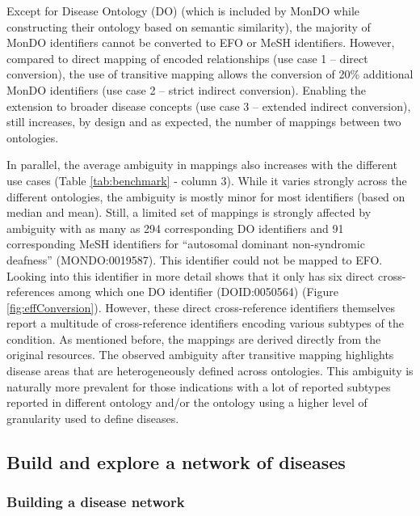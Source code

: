 \documentclass[9pt,a4paper,]{extarticle}
\begin{document}
Except for Disease Ontology (DO) (which is included by MonDO while constructing their ontology based on semantic similarity), the majority of MonDO identifiers cannot be converted to EFO or MeSH identifiers. However, compared to direct mapping of encoded relationships (use case 1 -- direct conversion), the use of transitive mapping allows the conversion of 20\% additional MonDO identifiers (use case 2 -- strict indirect conversion). Enabling the extension to broader disease concepts (use case 3 -- extended indirect conversion), still increases, by design and as expected, the number of mappings between two ontologies.

In parallel, the average ambiguity in mappings also increases with the different use cases (Table \ref{tab:benchmark} - column 3). While it varies strongly across the different ontologies, the ambiguity is mostly minor for most identifiers (based on median and mean). Still, a limited set of mappings is strongly affected by ambiguity with as many as 294 corresponding DO identifiers and 91 corresponding MeSH identifiers for ``autosomal dominant non-syndromic deafness'' (MONDO:0019587). This identifier could not be mapped to EFO. Looking into this identifier in more detail shows that it only has six direct cross-references among which one DO identifier (DOID:0050564) (Figure \ref{fig:effConversion}). However, these direct cross-reference identifiers themselves report a multitude of cross-reference identifiers encoding various subtypes of the condition. As mentioned before, the mappings are derived directly from the original resources. The observed ambiguity after transitive mapping highlights disease areas that are heterogeneously defined across ontologies. This ambiguity is naturally more prevalent for those indications with a lot of reported subtypes reported in different ontology and/or the ontology using a higher level of granularity used to define diseases.

\hypertarget{build-and-explore-a-network-of-diseases}{%
\subsection{Build and explore a network of diseases}\label{build-and-explore-a-network-of-diseases}}

\hypertarget{building-a-disease-network}{%
\subsubsection{Building a disease network}\label{building-a-disease-network}}
\end{document}
